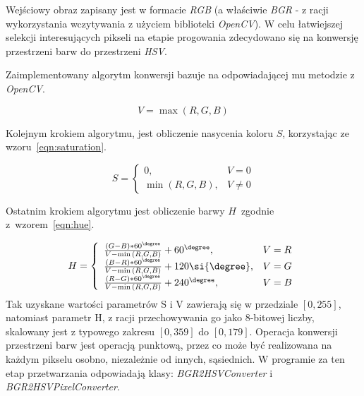 Wejściowy obraz zapisany jest w formacie \emph{RGB} (a właściwie \emph{BGR} - z racji wykorzystania wczytywania z użyciem biblioteki \emph{OpenCV}). W celu łatwiejszej selekcji interesujących pikseli na etapie progowania zdecydowano się na konwersję przestrzeni barw do przestrzeni \emph{HSV}.

Zaimplementowany algorytm konwersji bazuje na odpowiadającej mu metodzie z \emph{OpenCV}.

\begin{equation}
    \label{eqn:value}
    V = \max{(R, G, B)}
\end{equation}

Kolejnym krokiem algorytmu, jest obliczenie nasycenia koloru $S$, korzystając ze wzoru~\ref{eqn:saturation}.

\begin{equation}
    \label{eqn:saturation}
    S = \left\{ 
        \begin{array}{ll}
            0, & V = 0 \\
            \min{(R, G, B)}, & V \ne 0
        \end{array} 
        \right.
\end{equation}

Ostatnim krokiem algorytmu jest obliczenie barwy $H$~zgodnie z~wzorem~\ref{eqn:hue}.

\begin{equation}
    \label{eqn:hue}
    H = \left\{ 
        \begin{array}{ll}
            \frac{(G - B) * 60^{\degree}}{V - \min{(R, G, B)}} + 60^{\degree}, & V = R \\
            \frac{(B - R) * 60^{\degree}}{V - \min{(R, G, B)}} + 120\si{\degree}, & V = G \\
            \frac{(R - G) * 60^{\degree}}{V - \min{(R, G, B)}} + 240^{\degree}, & V = B
        \end{array} 
        \right.
\end{equation}
Tak uzyskane wartości parametrów S i V zawierają się w przedziale $[0, 255]$, natomiast parametr H, z racji przechowywania go jako 8-bitowej liczby, skalowany jest z typowego zakresu $[0, 359]$ do $[0, 179]$.
Operacja konwersji przestrzeni barw jest operacją punktową, przez co może być realizowana na każdym pikselu osobno, niezależnie od innych, sąsiednich.
W programie za ten etap przetwarzania odpowiadają klasy: \emph{BGR2HSVConverter} i \emph{BGR2HSVPixelConverter}.
